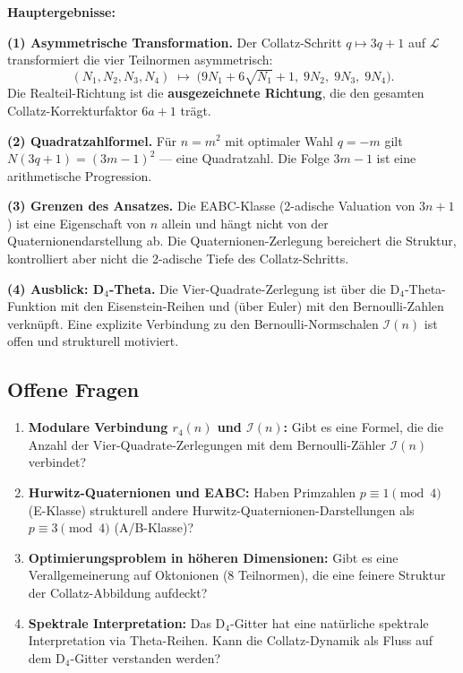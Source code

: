 \documentclass[12pt,a4paper]{article}
\newcommand{\In}{\mathcal{I}}
\begin{document}
\begin{tcolorbox}[hauptsatz]
\textbf{Hauptergebnisse:}

\medskip
\textbf{(1) Asymmetrische Transformation.}
Der Collatz-Schritt $q \mapsto 3q+1$ auf $\mathcal{L}$ transformiert die
vier Teilnormen asymmetrisch:
\[
  (N_1, N_2, N_3, N_4) \;\mapsto\;
  \bigl(9N_1 + 6\sqrt{N_1}+1,\; 9N_2,\; 9N_3,\; 9N_4\bigr).
\]
Die Realteil-Richtung ist die \textbf{ausgezeichnete Richtung}, die den
gesamten Collatz-Korrekturfaktor $6a+1$ trägt.

\medskip
\textbf{(2) Quadratzahlformel.}
Für $n = m^2$ mit optimaler Wahl $q = -m$ gilt $N(3q+1) = (3m-1)^2$ ---
eine Quadratzahl. Die Folge $3m-1$ ist eine arithmetische Progression.

\medskip
\textbf{(3) Grenzen des Ansatzes.}
Die EABC-Klasse (2-adische Valuation von $3n+1$) ist eine Eigenschaft von $n$
allein und hängt nicht von der Quaternionendarstellung ab.
Die Quaternionen-Zerlegung bereichert die Struktur, kontrolliert aber nicht
die 2-adische Tiefe des Collatz-Schritts.

\medskip
\textbf{(4) Ausblick: D${}_4$-Theta.}
Die Vier-Quadrate-Zerlegung ist über die D${}_4$-Theta-Funktion mit den
Eisenstein-Reihen und (über Euler) mit den Bernoulli-Zahlen verknüpft.
Eine explizite Verbindung zu den Bernoulli-Normschalen $\In(n)$ ist offen
und strukturell motiviert.
\end{tcolorbox}

\subsection{Offene Fragen}

\begin{tcolorbox}[lücke]
\begin{enumerate}[leftmargin=*, label=(\arabic*)]
  \item \textbf{Modulare Verbindung $r_4(n)$ und $\In(n)$:}
        Gibt es eine Formel, die die Anzahl der Vier-Quadrate-Zerlegungen
        mit dem Bernoulli-Zähler $\In(n)$ verbindet?

  \item \textbf{Hurwitz-Quaternionen und EABC:}
        Haben Primzahlen $p \equiv 1 \pmod 4$ (E-Klasse) strukturell andere
        Hurwitz-Quaternionen-Darstellungen als $p \equiv 3 \pmod 4$ (A/B-Klasse)?

  \item \textbf{Optimierungsproblem in höheren Dimensionen:}
        Gibt es eine Verallgemeinerung auf Oktonionen (8 Teilnormen), die eine
        feinere Struktur der Collatz-Abbildung aufdeckt?

  \item \textbf{Spektrale Interpretation:}
        Das D${}_4$-Gitter hat eine natürliche spektrale Interpretation via
        Theta-Reihen. Kann die Collatz-Dynamik als Fluss auf dem D${}_4$-Gitter
        verstanden werden?
\end{enumerate}
\end{tcolorbox}
\end{document}
